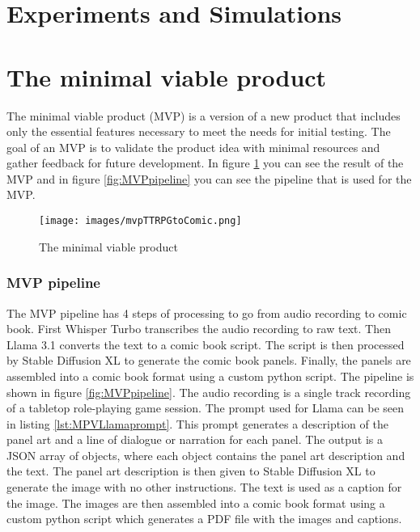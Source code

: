 
\section{Experiments and Simulations}

\section{The minimal viable product}
The minimal viable product (MVP) is a version of a new product that includes only the essential features necessary to meet the needs for initial testing. The goal of an MVP is to validate the product idea with minimal resources and gather feedback for future development. In figure \ref{fig:MVP} you can see the result of the MVP and in figure \ref{fig:MVPpipeline} you can see the pipeline that is used for the MVP.

\begin{figure}[!htp]
    \centering
    \texttt{[image: images/mvpTTRPGtoComic.png]}
    \caption[The minimal viable product]{The minimal viable product}
    \label{fig:MVP}
\end{figure}

\subsubsection{MVP pipeline}
The MVP pipeline has 4 steps of processing to go from audio recording to comic book. First Whisper Turbo transcribes the audio recording to raw text. Then Llama 3.1 converts the text to a comic book script. The script is then processed by Stable Diffusion XL to generate the comic book panels. Finally, the panels are assembled into a comic book format using a custom python script. The pipeline is shown in figure \ref{fig:MVPpipeline}. The audio recording is a single track recording of a tabletop role-playing game session. The prompt used for Llama can be seen in listing \ref{lst:MPVLlamaprompt}. This prompt generates a description of the panel art and a line of dialogue or narration for each panel. The output is a JSON array of objects, where each object contains the panel art description and the text. The panel art description is then given to Stable Diffusion XL to generate the image with no other instructions. The text is used as a caption for the image. The images are then assembled into a comic book format using a custom python script which generates a PDF file with the images and captions.

